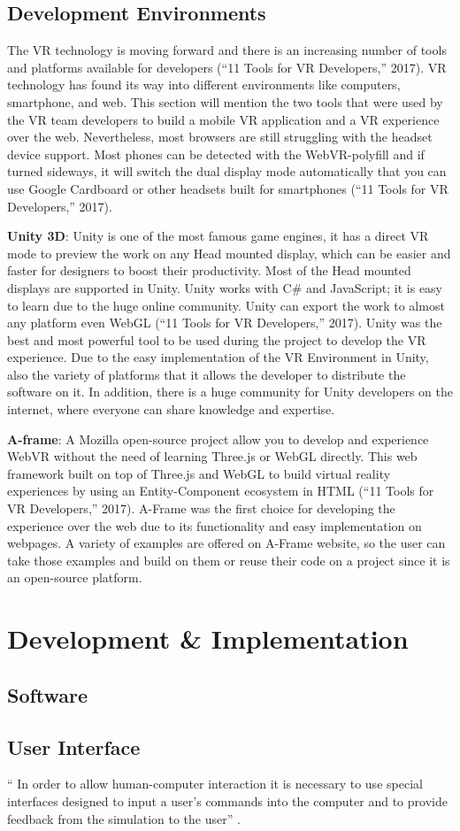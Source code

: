 \subsection{Development Environments}

The VR technology is moving forward and there is an increasing number of tools and platforms
available for developers (“11 Tools for VR Developers,” 2017). VR technology has found its
way into different environments like computers, smartphone, and web. This section will
mention the two tools that were used by the VR team developers to build a mobile VR
application and a VR experience over the web. Nevertheless, most browsers are still struggling
with the headset device support. Most phones can be detected with the WebVR-polyfill and
if turned sideways, it will switch the dual display mode automatically that you can use Google
Cardboard or other headsets built for smartphones (“11 Tools for VR Developers,” 2017).


\textbf{Unity 3D}: Unity is one of the most famous game engines, it has a direct VR mode to preview
the work on any Head mounted display, which can be easier and faster for designers to boost
their productivity. Most of the Head mounted displays are supported in Unity. Unity works
with C\# and JavaScript; it is easy to learn due to the huge online community. Unity can export
the work to almost any platform even WebGL (“11 Tools for VR Developers,” 2017). Unity was
the best and most powerful tool to be used during the project to develop the VR experience.
Due to the easy implementation of the VR Environment in Unity, also the variety of platforms
that it allows the developer to distribute the software on it. In addition, there is a huge
community for Unity developers on the internet, where everyone can share knowledge and
expertise.


\textbf{A-frame}: A Mozilla open-source project allow you to develop and experience WebVR without
the need of learning Three.js or WebGL directly. This web framework built on top of Three.js
and WebGL to build virtual reality experiences by using an Entity-Component ecosystem in
HTML (“11 Tools for VR Developers,” 2017). A-Frame was the first choice for developing the
experience over the web due to its functionality and easy implementation on webpages. A
variety of examples are offered on A-Frame website, so the user can take those examples and
build on them or reuse their code on a project since it is an open-source platform.


\section{Development \& Implementation}

\subsection{Software}

\subsection{User Interface}

“ In order to allow human-computer interaction it is necessary to use special interfaces designed to input a user's commands into the computer and to provide feedback from the simulation to the user” \citep{burdea2017virtual}.